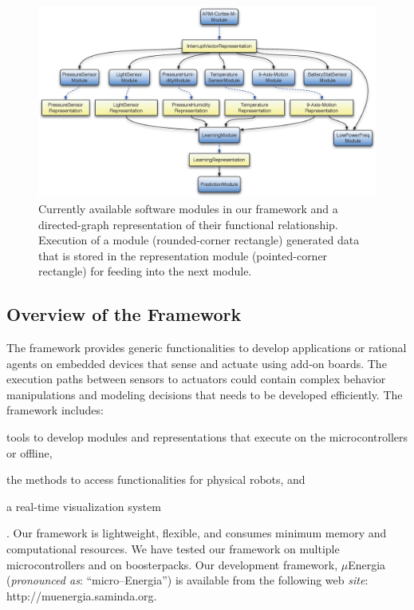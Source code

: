 \documentclass[]{IEEEtran}
\begin{document}
\begin{figure}[!t]
\centering
\includegraphics[width=.75\textwidth]{figures/graph_structure_def-crop3.eps}
\caption{Currently available software modules in our framework and a directed-graph representation of their functional relationship. Execution of a module (rounded-corner rectangle) generated data that is stored in the representation module (pointed-corner rectangle) for feeding into the next module.}
 \label{fig:framework}
\end{figure}

\subsection{Overview of the Framework}
\label{sec:OverviewOfTheFramework}

\par
The framework provides generic functionalities to develop applications or rational agents 
on embedded devices that sense and actuate using add-on boards. The execution paths between sensors 
to actuators could contain complex behavior manipulations and modeling decisions that needs to be 
developed efficiently.
The framework 
includes: \begin{inparaenum}[($i$)] \item tools to develop modules and representations that execute on 
the microcontrollers or offline, \item the methods to access functionalities for physical 
robots, 
and \item a real-time visualization system\end{inparaenum}. Our framework is lightweight, flexible, 
and consumes minimum memory and computational resources. We have tested our framework on multiple 
microcontrollers and on boosterpacks. 
Our development framework, $\mu$Energia (\textit{pronounced as}: ``micro--Energia'') is available from the following web 
\textit{site}:
{http://muenergia.saminda.org}.
\end{document}
